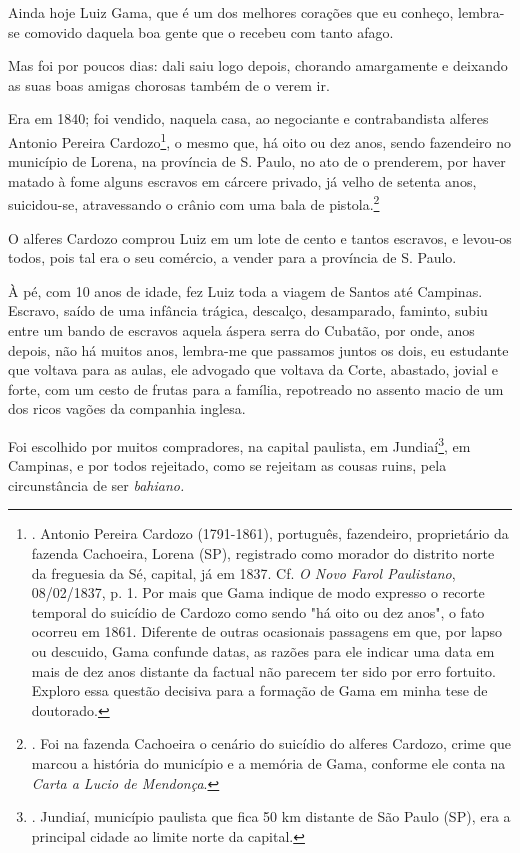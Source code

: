 Ainda hoje Luiz Gama, que é um dos melhores corações que eu conheço,
lembra-se comovido daquela boa gente que o recebeu com tanto afago.

Mas foi por poucos dias: dali saiu logo depois, chorando amargamente e
deixando as suas boas amigas chorosas também de o verem ir.

Era em 1840; foi vendido, naquela casa, ao negociante e contrabandista
alferes Antonio Pereira Cardozo\footnote{. Antonio Pereira Cardozo
  (1791-1861), português, fazendeiro, proprietário da fazenda Cachoeira,
  Lorena (SP), registrado como morador do distrito norte da freguesia da
  Sé, capital, já em 1837. Cf. \emph{O Novo Farol Paulistano},
  08/02/1837, p. 1. Por mais que Gama indique de modo expresso o recorte
  temporal do suicídio de Cardozo como sendo "há oito ou dez anos", o
  fato ocorreu em 1861. Diferente de outras ocasionais passagens em que,
  por lapso ou descuido, Gama confunde datas, as razões para ele indicar
  uma data em mais de dez anos distante da factual não parecem ter sido
  por erro fortuito. Exploro essa questão decisiva para a formação de
  Gama em minha tese de doutorado.}, o mesmo que, há oito ou dez anos,
sendo fazendeiro no município de Lorena, na província de S. Paulo, no
ato de o prenderem, por haver matado à fome alguns escravos em cárcere
privado, já velho de setenta anos, suicidou-se, atravessando o crânio
com uma bala de pistola.\footnote{. Foi na fazenda Cachoeira o cenário
  do suicídio do alferes Cardozo, crime que marcou a história do
  município e a memória de Gama, conforme ele conta na \emph{Carta a
  Lucio de Mendonça}.}

O alferes Cardozo comprou Luiz em um lote de cento e tantos escravos, e
levou-os todos, pois tal era o seu comércio, a vender para a província
de S. Paulo.

À pé, com 10 anos de idade, fez Luiz toda a viagem de Santos até
Campinas. Escravo, saído de uma infância trágica, descalço, desamparado,
faminto, subiu entre um bando de escravos aquela áspera serra do
Cubatão, por onde, anos depois, não há muitos anos, lembra-me que
passamos juntos os dois, eu estudante que voltava para as aulas, ele
advogado que voltava da Corte, abastado, jovial e forte, com um cesto de
frutas para a família, repotreado no assento macio de um dos ricos
vagões da companhia inglesa.

Foi escolhido por muitos compradores, na capital paulista, em
Jundiaí\footnote{. Jundiaí, município paulista que fica 50 km distante
  de São Paulo (SP), era a principal cidade ao limite norte da capital.},
em Campinas, e por todos rejeitado, como se rejeitam as cousas ruins,
pela circunstância de ser \emph{bahiano.}

